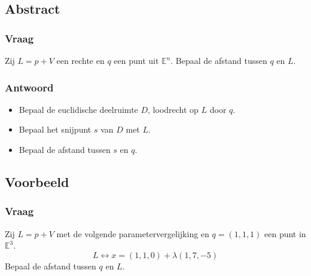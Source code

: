 \documentclass[main.tex]{subfiles}
\begin{document}
\subsection*{Abstract}
\subsubsection*{Vraag}
\begin{center}
  Zij $L=p+V$ een rechte en $q$ een punt uit $\mathbb{E}^{n}$.
  Bepaal de afstand tussen $q$ en $L$.
\end{center}

\subsubsection*{Antwoord}
\begin{itemize}
\item Bepaal de euclidische deelruimte $D$, loodrecht op $L$ door $q$.
\item Bepaal het snijpunt $s$ van $D$ met $L$.
\item Bepaal de afstand tussen $s$ en $q$.
\end{itemize}

\subsection*{Voorbeeld}
\subsubsection*{Vraag}
\begin{center}
  Zij $L=p+V$ met de volgende parametervergelijking en $q=(1,1,1)$ een
  punt in $\mathbb{E}^{3}$.
  \[ L \leftrightarrow x = (1,1,0) + \lambda (1,7,-5) \]
  Bepaal de afstand tussen $q$ en $L$.
\end{center}
\end{document}
